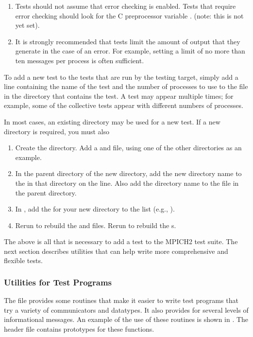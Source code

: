 \begin{enumerate}
\item Tests should not assume that error checking is enabled.  Tests
that require error checking should look for the C preprocessor
variable . (note: this is not yet set).

\item It is strongly recommended that tests limit the amount of output
that they generate in the case of an error.  For example, setting a
limit of no more than ten messages per process is often sufficient.  
\end{enumerate}

To add a new test to the tests that are run by the testing target,
simply add a line containing the name of the test and the number of
processes to use to the file  in the directory that
contains the test.  A test may appear multiple times; for example,
some of the collective tests appear with different numbers of
processes.

In most cases, an existing directory may be used for a new test.  If a
new directory is required, you must also 
\begin{enumerate}
\item Create the directory.  Add a  and
 file, using one of the other directories as an
example.
\item In the parent directory of the new directory, add the new
directory name to the  in that directory on the
 line.  Also add the directory name to the
 file in the parent directory.
\item In , add the  for
your new directory to the 
 list (e.g., ).
\item Rerun  to rebuild the 
and  files.  Rerun  to rebuild the
s.  
\end{enumerate}

The above is all that is necessary to add a test to the MPICH2 test
suite.  The next section describes utilities that can help write more
comprehensive and flexible tests.

\subsubsection{Utilities for Test Programs}
\label{sec:test-utilities}
The file  provides some routines that make
it easier to write test programs that try a variety of communicators
and datatypes.  It also provides for several levels of informational
messages.  An example of the use of these routines is shown in
.   The header file
 contains prototypes for these functions.

